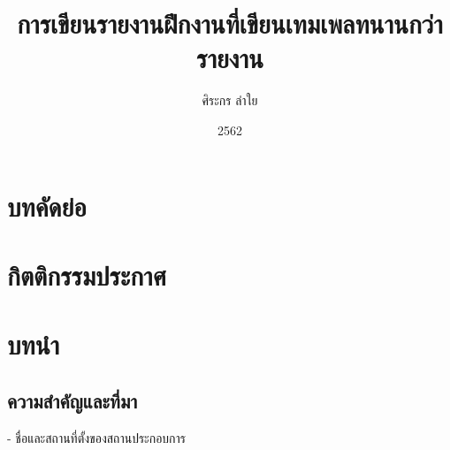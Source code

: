 \documentclass[16pt,a4]{internshipreport}
\title{การเขียนรายงานฝึกงานที่เขียนเทมเพลทนานกว่ารายงาน}
\date{2562}
\author{ศิระกร ลำใย}
\begin{document}
\maketitle

\section*{บทคัดย่อ}
\lipsum[2-4]

\section*{กิตติกรรมประกาศ}
\lipsum[2-4]

\section{บทนำ}
\subsection{ความสำคัญและที่มา}
- ชื่อและสถานที่ตั้งของสถานประกอบการ
\lipsum[1]
\end{document}
